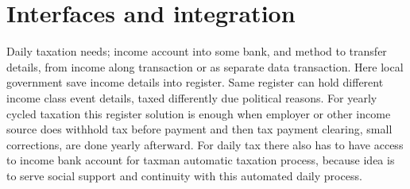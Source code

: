 \section{Interfaces and integration}
\label{interfaces_and_integration}
Daily taxation needs; income account into some bank, and met\-hod to transfer details,
from income along transaction or as separate data transaction.
Here local government save income details into register.
Same register can hold different income class event details,
taxed differently due political reasons.
For yearly cycled taxation this register solution is enough
when employer or other income source does withhold tax before payment
and then tax payment clearing, small corrections, are done yearly afterward.
For daily tax there also has to have access to income bank account
for taxman automatic taxation process,
because idea is to serve social support and continuity
with this automated daily process.

